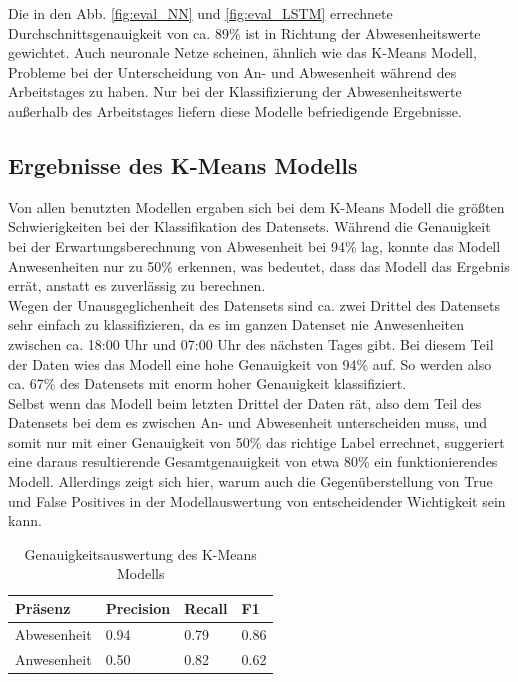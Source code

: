 Die in den Abb. \ref{fig:eval_NN} und \ref{fig:eval_LSTM} errechnete Durchschnittsgenauigkeit von ca. 89\%
ist in Richtung der Abwesenheitswerte gewichtet. Auch neuronale Netze scheinen, ähnlich wie das K-Means Modell,
Probleme bei der Unterscheidung von An- und Abwesenheit während des Arbeitstages zu haben. Nur bei der 
Klassifizierung der Abwesenheitswerte außerhalb des Arbeitstages liefern diese Modelle befriedigende 
Ergebnisse.
\newpage

\subsection{Ergebnisse des K-Means Modells}\label{KMeans}
Von allen benutzten Modellen ergaben sich bei dem K-Means Modell die größten Schwierigkeiten bei der 
Klassifikation des Datensets. 
Während die Genauigkeit bei der Erwartungsberechnung von Abwesenheit bei 94\% lag, konnte das
Modell Anwesenheiten nur zu 50\% erkennen, was bedeutet, dass das Modell das Ergebnis errät, anstatt
es zuverlässig zu berechnen. \\
Wegen der Unausgeglichenheit des Datensets sind ca. zwei Drittel des Datensets sehr einfach zu 
klassifizieren, da es im ganzen Datenset nie Anwesenheiten zwischen ca. 18:00 Uhr und 07:00 Uhr des nächsten 
Tages gibt. Bei diesem Teil der Daten wies das Modell eine hohe Genauigkeit von 94\% auf. So werden also 
ca. 67\% des Datensets mit enorm hoher Genauigkeit klassifiziert.\\
Selbst wenn das Modell beim letzten Drittel der Daten rät, also dem Teil des Datensets bei dem es zwischen
An- und Abwesenheit unterscheiden muss, und somit nur mit einer Genauigkeit von 50\% das richtige Label 
errechnet, suggeriert eine daraus resultierende Gesamtgenauigkeit von etwa 80\% ein funktionierendes Modell.
Allerdings zeigt sich hier, warum auch die Gegenüberstellung von True und False Positives in der 
Modellauswertung von entscheidender Wichtigkeit sein kann.\\

\begin{center}
    \begin{table}[h]
        \centering
        \caption{Genauigkeitsauswertung des K-Means Modells}
        \begin{tabular}{|p{2.5cm}||p{1.8cm}|p{1.5cm}|p{1.5cm}|}
            \hline
            \hfill Präsenz&\hfill Precision &\hfill Recall &\hfill F1\\
            \hline
            \hline
            \hfill Abwesenheit&\hfill 0.94&\hfill 0.79&\hfill 0.86\\
            \hfill Anwesenheit&\hfill 0.50&\hfill 0.82&\hfill 0.62\\
            \hline
        \end{tabular}          
        \label{tab:clus}
    \end{table}
\end{center}

